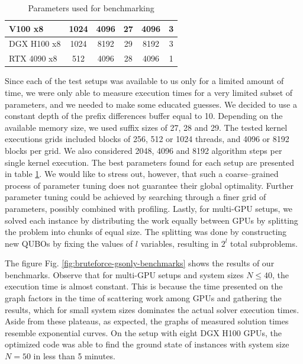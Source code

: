 \begin{table}[!ht]
\begin{tabular}{|l|c|c|c|c|c|}
    \hline
    V100 x8                                                          & 1024                                                              & 4096                                                         & 27                                 & 4096                                          & 3   \\
    \hline
    DGX H100 x8                                                      & 1024                                                              & 8192                                                         & 29                                 & 8192                                          & 3   \\
    \hline
    RTX 4090 x8                                                      & 512                                                               & 4096                                                         & 28                                 & 4096                                          & 1   \\
    \hline
  \end{tabular}
  \caption{Parameters used for benchmarking} \label{tab:bruteforce-gs-only-table}
\end{table}

Since each of the test setups was available to us only for a limited amount of
time, we were only able to measure execution times for a very limited subset of
parameters, and we needed to make some educated guesses. We decided to use a
constant depth of the prefix differences buffer equal to 10. Depending on the
available memory size, we used suffix sizes of 27, 28 and 29. The tested kernel
executions grids included blocks of 256, 512 or 1024 threads, and 4096 or 8192
blocks per grid. We also considered 2048, 4096 and 8192 algorithm steps per
single kernel execution. The best parameters found for each setup are presented
in table \ref{tab:bruteforce-gs-only-table}. We would like to stress out,
however, that such a coarse--grained process of parameter tuning does not
guarantee their global optimality. Further parameter tuning could be achieved
by searching through a finer grid of parameters, possibly combined with
profiling. Lastly, for multi-GPU setups, we solved each instance by
distributing the work equally between GPUs by splitting the problem into chunks
of equal size. The splitting was done by constructing new QUBOs by fixing the
values of $l$ variables, resulting in $2^{l}$ total subproblems.

The figure Fig. \ref{fig:bruteforce-gsonly-benchmarks} shows the results of our
benchmarks. Observe that for multi-GPU setups and system sizes $N \le 40$, the
execution time is almost constant. This is because the time presented on the
graph factors in the time of scattering work among GPUs and gathering the
results, which for small system sizes dominates the actual solver execution
times. Aside from these plateaus, as expected, the graphs of measured solution
times resemble exponential curves. On the setup with eight DGX H100 GPUs, the
optimized code was able to find the ground state of instances with system size
$N=50$ in less than 5 minutes.

